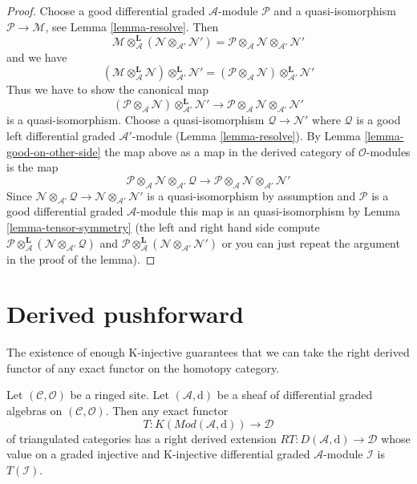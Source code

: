 \begin{proof}
Choose a good differential graded $\mathcal{A}$-module
$\mathcal{P}$ and a quasi-isomorphism $\mathcal{P} \to \mathcal{M}$, see
Lemma \ref{lemma-resolve}. Then
$$
\mathcal{M}
\otimes_\mathcal{A}^\mathbf{L}
(\mathcal{N} \otimes_{\mathcal{A}'} \mathcal{N}') =
\mathcal{P} \otimes_\mathcal{A} \mathcal{N}
\otimes_{\mathcal{A}'} \mathcal{N}'
$$
and we have
$$
(\mathcal{M}
\otimes_\mathcal{A}^\mathbf{L} \mathcal{N})
\otimes_{\mathcal{A}'}^\mathbf{L} \mathcal{N}' =
(\mathcal{P} \otimes_\mathcal{A} \mathcal{N})
\otimes_{\mathcal{A}'}^\mathbf{L} \mathcal{N}'
$$
Thus we have to show the canonical map
$$
(\mathcal{P} \otimes_\mathcal{A} \mathcal{N})
\otimes_{\mathcal{A}'}^\mathbf{L} \mathcal{N}'
\longrightarrow
\mathcal{P} \otimes_\mathcal{A} \mathcal{N}
\otimes_{\mathcal{A}'} \mathcal{N}'
$$
is a quasi-isomorphism. Choose a quasi-isomorphism
$\mathcal{Q} \to \mathcal{N}'$ where $\mathcal{Q}$
is a good left differential graded $\mathcal{A}'$-module
(Lemma \ref{lemma-resolve}).
By Lemma \ref{lemma-good-on-other-side} the map
above as a map in the derived category of $\mathcal{O}$-modules is the map
$$
\mathcal{P} \otimes_\mathcal{A} \mathcal{N}
\otimes_{\mathcal{A}'} \mathcal{Q}
\longrightarrow
\mathcal{P} \otimes_\mathcal{A} \mathcal{N}
\otimes_{\mathcal{A}'} \mathcal{N}'
$$
Since $\mathcal{N} \otimes_{\mathcal{A}'} \mathcal{Q} \to
\mathcal{N} \otimes_{\mathcal{A}'} \mathcal{N}'$ is a quasi-isomorphism
by assumption and $\mathcal{P}$ is a good differential graded
$\mathcal{A}$-module this map is an quasi-isomorphism by
Lemma \ref{lemma-tensor-symmetry} (the left and right hand side
compute $\mathcal{P} \otimes_\mathcal{A}^\mathbf{L} (\mathcal{N}
\otimes_{\mathcal{A}'} \mathcal{Q})$ and
$\mathcal{P} \otimes_\mathcal{A}^\mathbf{L} (\mathcal{N}
\otimes_{\mathcal{A}'} \mathcal{N}')$ or you can just repeat
the argument in the proof of the lemma).
\end{proof}






\section{Derived pushforward}
\label{section-derived-pushforward}

\noindent
The existence of enough K-injective guarantees that we can take the right
derived functor of any exact functor on the homotopy category.

\begin{lemma}
\label{lemma-right-derived}
Let $(\mathcal{C}, \mathcal{O})$ be a ringed site.
Let $(\mathcal{A}, \text{d})$ be a sheaf of differential graded algebras on
$(\mathcal{C}, \mathcal{O})$. Then any exact functor
$$
T : K(\textit{Mod}(\mathcal{A}, \text{d})) \longrightarrow \mathcal{D}
$$
of triangulated categories has a right derived extension
$RT : D(\mathcal{A}, \text{d}) \to \mathcal{D}$
whose value on a graded injective and K-injective
differential graded $\mathcal{A}$-module $\mathcal{I}$
is $T(\mathcal{I})$.
\end{lemma}

